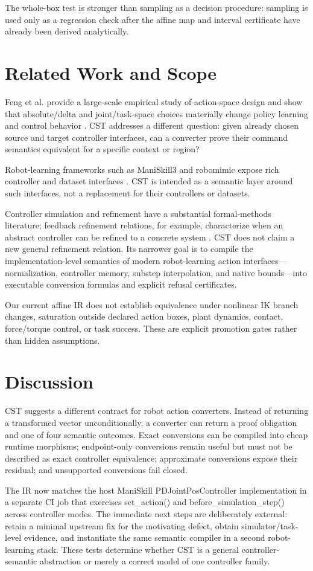 \documentclass[conference]{IEEEtran}
\begin{document}
The whole-box test is stronger than sampling as a decision procedure: sampling
is used only as a regression check after the affine map and interval certificate
have already been derived analytically.

\section{Related Work and Scope}
Feng et al. provide a large-scale empirical study of action-space design and
show that absolute/delta and joint/task-space choices materially change policy
learning and control behavior \cite{feng2026action}. CST addresses a different
question: given already chosen source and target controller interfaces, can a
converter prove their command semantics equivalent for a specific context or
region?

Robot-learning frameworks such as ManiSkill3 and robomimic expose rich
controller and dataset interfaces \cite{tao2025maniskill3,mimic2021}. CST is
intended as a semantic layer around such interfaces, not a replacement for
their controllers or datasets.

Controller simulation and refinement have a substantial formal-methods
literature; feedback refinement relations, for example, characterize when an
abstract controller can be refined to a concrete system
\cite{reissig2017frr}. CST does not claim a new general refinement relation.
Its narrower goal is to compile the implementation-level semantics of modern
robot-learning action interfaces---normalization, controller memory,
substep interpolation, and native bounds---into executable conversion formulas
and explicit refusal certificates.

Our current affine IR does not establish equivalence under nonlinear IK branch
changes, saturation outside declared action boxes, plant dynamics, contact,
force/torque control, or task success. These are explicit promotion gates rather
than hidden assumptions.

\section{Discussion}
CST suggests a different contract for robot action converters. Instead of
returning a transformed vector unconditionally, a converter can return a
proof obligation and one of four semantic outcomes. Exact conversions can be
compiled into cheap runtime morphisms; endpoint-only conversions remain useful
but must not be described as exact controller equivalence; approximate
conversions expose their residual; and unsupported conversions fail closed.

The IR now matches the host ManiSkill PDJointPosController implementation in a separate CI job that exercises set_action() and before_simulation_step() across controller modes. The immediate next steps are deliberately external: retain a minimal upstream fix for the motivating defect, obtain simulator/task-level evidence, and instantiate the same semantic compiler in a second robot-learning stack. These tests determine whether CST is a general controller-semantic
abstraction or merely a correct model of one controller family.



\end{document}

